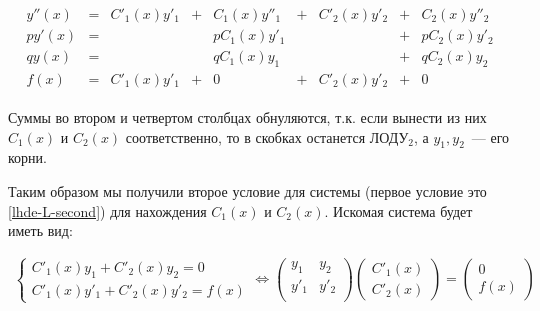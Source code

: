 \begin{align*}
  \begin{matrix}
    y''(x) & = &
    C'_{1}(x) y'_{1} & + & C_{1}(x) y''_{1}
    & + & C'_{2}(x) y'_{2} & + & C_{2}(x) y''_{2}
    \\
    p y'(x) & = &&& p C_{1}(x) y'_{1} &&& + & p C_{2}(x) y'_{2}
    \\
    q y(x) & = &&& q C_{1}(x) y_{1} &&& + & q C_{2}(x) y_{2}
    \\
    f(x) & = & C'_{1}(x) y'_{1} & + & 0 & + & C'_{2}(x) y'_{2} & + & 0
  \end{matrix}
\end{align*}

Суммы во втором и четвертом столбцах обнуляются, т.к. если вынести из них
\(C_{1}(x)\) и \(C_{2}(x)\) соответственно, то в скобках останется ЛОДУ\(_2\),
а \(y_{1}, y_{2}\)~--- его корни.

Таким образом мы получили второе условие для системы (первое условие это
\ref{lhde-L-second}) для нахождения \(C_{1}(x)\) и \(C_{2}(x)\). Искомая
система будет иметь вид:

\begin{align*}
  \begin{cases}
    C'_{1}(x) y_{1} + C'_{2}(x) y_{2} = 0 \\
    C'_{1}(x) y'_{1} + C'_{2}(x) y'_{2} = f(x)
  \end{cases} \iff
  \begin{pmatrix}
    y_{1} & y_{2} \\
    y'_{1} & y'_{2} \\
  \end{pmatrix}
  \begin{pmatrix}
    C'_{1}(x) \\
    C'_{2}(x)
  \end{pmatrix}
  =
  \begin{pmatrix}
    0 \\
    f(x)
  \end{pmatrix}
\end{align*}

